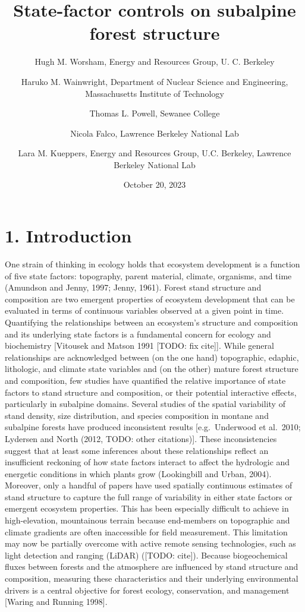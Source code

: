 \documentclass[
  12pt,
]{article}
\title{\textbf{State-factor controls on subalpine forest structure}}
\author{Hugh M. Worsham, Energy and Resources Group, U. C.
Berkeley \and Haruko M. Wainwright, Department of Nuclear Science and
Engineering, Massachusetts Institute of Technology \and Thomas L.
Powell, Sewanee College \and Nicola Falco, Lawrence Berkeley National
Lab \and Lara M. Kueppers, Energy and Resources Group, U.C. Berkeley,
Lawrence Berkeley National Lab}
\date{October 20, 2023}
\begin{document}
\maketitle

\section{1. Introduction}\label{introduction}

One strain of thinking in ecology holds that ecosystem development is a
function of five state factors: topography, parent material, climate,
organisms, and time (Amundson and Jenny, 1997; Jenny, 1961). Forest
stand structure and composition are two emergent properties of ecosystem
development that can be evaluated in terms of continuous variables
observed at a given point in time. Quantifying the relationships between
an ecosystem's structure and composition and its underlying state
factors is a fundamental concern for ecology and biochemistry
{[}Vitousek and Matson 1991 {[}TODO: fix cite{]}{]}. While general
relationships are acknowledged between (on the one hand) topographic,
edaphic, lithologic, and climate state variables and (on the other)
mature forest structure and composition, few studies have quantified the
relative importance of state factors to stand structure and composition,
or their potential interactive effects, particularly in subalpine
domains. Several studies of the spatial variability of stand density,
size distribution, and species composition in montane and subalpine
forests have produced inconsistent results {[}e.g.~Underwood et
al.~2010; Lydersen and North (2012, TODO: other citations){]}. These
inconsistencies suggest that at least some inferences about these
relationships reflect an insufficient reckoning of how state factors
interact to affect the hydrologic and energetic conditions in which
plants grow (Lookingbill and Urban, 2004). Moreover, only a handful of
papers have used spatially continuous estimates of stand structure to
capture the full range of variability in either state factors or
emergent ecosystem properties. This has been especially difficult to
achieve in high-elevation, mountainous terrain because end-members on
topographic and climate gradients are often inaccessible for field
measurement. This limitation may now be partially overcome with active
remote sensing technologies, such as light detection and ranging (LiDAR)
({[}TODO: cite{]}). Because biogeochemical fluxes between forests and
the atmosphere are influenced by stand structure and composition,
measuring these characteristics and their underlying environmental
drivers is a central objective for forest ecology, conservation, and
management {[}Waring and Running 1998{]}.
\end{document}
